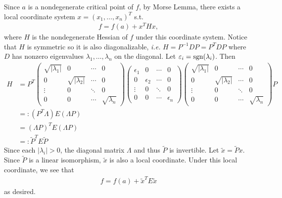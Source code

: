 \documentclass[12pt]{article}
\begin{document}
\begin{problem}[1.7.11]
Since $ a$ is a nondegenerate critical point of  $ f$, by Morse Lemma, there exists a local coordinate system $ x=(x_1,\ldots,x_n)^{T}$ s.t.\ 
\begin{align*}
f=f(a) + x^{T}Hx,
\end{align*}
where $ H$ is the nondegenerate Hessian of  $ f$ under this coordinate system. Notice that $ H$ is symmetric so it is also diagonalizable, \emph{i.e.} $ H=P ^{-1}D P = P^{T} D P $ where $ D$ has nonzero eigenvalues $ \lambda_1,\ldots, \lambda_n$ on the diagonal. Let $ \varepsilon_i = \operatorname{sgn} (\lambda_i)$. Then
 \begin{align*}
	 H &= P^{T} \begin{pmatrix} \sqrt{ |\lambda_1|} &0& \cdots&0\\0& \sqrt{ |\lambda_2|} & \cdots & 0\\ \vdots &0 &\ddots & 0 \\ 0& 0&\cdots& \sqrt{ \lambda_n} \end{pmatrix} \begin{pmatrix} \epsilon_1 &0& \cdots&0\\0& \epsilon_2 & \cdots & 0\\ \vdots &0 &\ddots & 0 \\ 0& 0&\cdots& \epsilon_n \end{pmatrix} \begin{pmatrix} \sqrt{ |\lambda_1|} &0& \cdots&0\\0& \sqrt{ |\lambda_2|} & \cdots & 0\\ \vdots &0 &\ddots & 0 \\ 0& 0&\cdots& \sqrt{ \lambda_n} \end{pmatrix} P\\
	 &=: (P^{T} \Lambda) E (\Lambda P) \\
	 &= (\Lambda P)^{T} E (\Lambda P) \\
	 &=: \widetilde{ P}^{T} E \widetilde{ P}  
\end{align*}
Since each $ |\lambda_i|>0$, the diagonal matrix $ \Lambda$ and thus $ \widetilde{ P}$ is invertible. Let $ \widetilde{ x} = \widetilde{ P}  x$. Since $ \widetilde{ P}$ is a linear isomorphism, $ \widetilde{ x}$ is also a local coordinate. Under this local coordinate, we see that
\begin{align*}
	f = f(a) + \widetilde{ x}^{T} E \widetilde{ x}
\end{align*}
as desired.
\end{problem}
\end{document}
